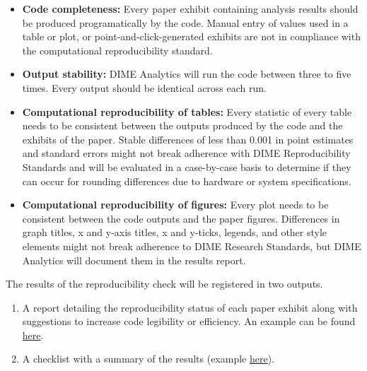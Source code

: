 \begin{fullwidth}
	\bigskip

	\begin{itemize}
		\setlength\itemsep{-0.1em}
		\item \textbf{Code completeness:} Every paper exhibit containing analysis results should be produced programatically by the code. Manual entry of values used in a table or plot, or point-and-click-generated exhibits are not in compliance with the computational reproducibility standard.
		\item \textbf{Output stability:} DIME Analytics will run the code between three to five times. Every output should be  identical across each run.
		\item \textbf{Computational reproducibility of tables:} Every statistic of every table needs to be consistent between the outputs produced by the code and the exhibits of the paper. Stable differences of less than 0.001 in point estimates and standard errors might not break adherence with DIME Reproducibility Standards and will be evaluated in a case-by-case basis to determine if they can occur for rounding differences due to hardware or system specifications.
		\item \textbf{Computational reproducibility of figures:} Every plot needs to be consistent between the code outputs and the paper figures. Differences in graph titles, x and y-axis titles, x and y-ticks, legends, and other style elements might not break adherence to DIME Research Standards, but DIME Analytics will document them in the results report.
	\end{itemize}

	\bigskip
	
	The results of the reproducibility check will be registered in two outputs.

	\bigskip

	\begin{enumerate}
		\setlength\itemsep{-0.1em}
		\item A report detailing the reproducibility status of each paper exhibit along with suggestions to increase code legibility or efficiency. An example can be found \href{https://github.com/worldbank/dime-standards/blob/master/dime-research-standards/pillar-3-research-reproducibility/DIME%20Analytics%20Reproducibility%20Check%20Comments%20example.pdf}{here}.
		\item A checklist with a summary of the results (example \href{https://raw.githubusercontent.com/worldbank/dime-standards/master/dime-research-standards/pillar-3-research-reproducibility/checklists/Reproducibility%20check%20result%20template.pdf}{here}).
	\end{enumerate}


\end{fullwidth}

